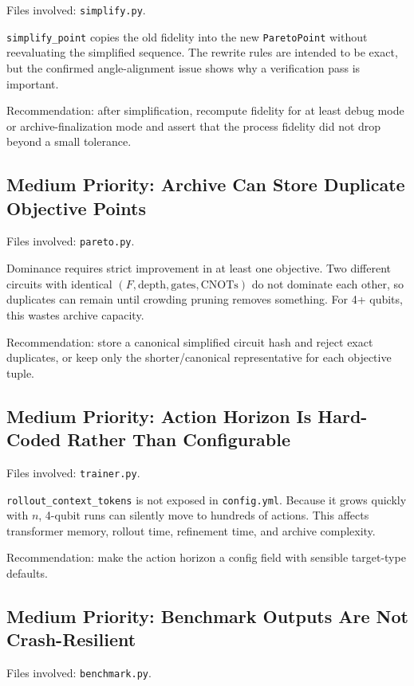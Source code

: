 \documentclass[11pt]{article}
\begin{document}
Files involved: \texttt{simplify.py}.

\texttt{simplify\_point} copies the old fidelity into the new \texttt{ParetoPoint}
without reevaluating the simplified sequence.  The rewrite rules are intended to
be exact, but the confirmed angle-alignment issue shows why a verification pass
is important.

Recommendation: after simplification, recompute fidelity for at least debug mode
or archive-finalization mode and assert that the process fidelity did not drop
beyond a small tolerance.

\subsection{Medium Priority: Archive Can Store Duplicate Objective Points}

Files involved: \texttt{pareto.py}.

Dominance requires strict improvement in at least one objective.  Two different
circuits with identical \((F,\mathrm{depth},\mathrm{gates},\mathrm{CNOTs})\) do
not dominate each other, so duplicates can remain until crowding pruning removes
something.  For 4+ qubits, this wastes archive capacity.

Recommendation: store a canonical simplified circuit hash and reject exact
duplicates, or keep only the shorter/canonical representative for each objective
tuple.

\subsection{Medium Priority: Action Horizon Is Hard-Coded Rather Than Configurable}

Files involved: \texttt{trainer.py}.

\texttt{rollout\_context\_tokens} is not exposed in \texttt{config.yml}.  Because
it grows quickly with \(n\), 4-qubit runs can silently move to hundreds of
actions.  This affects transformer memory, rollout time, refinement time, and
archive complexity.

Recommendation: make the action horizon a config field with sensible
target-type defaults.

\subsection{Medium Priority: Benchmark Outputs Are Not Crash-Resilient}

Files involved: \texttt{benchmark.py}.
\end{document}
